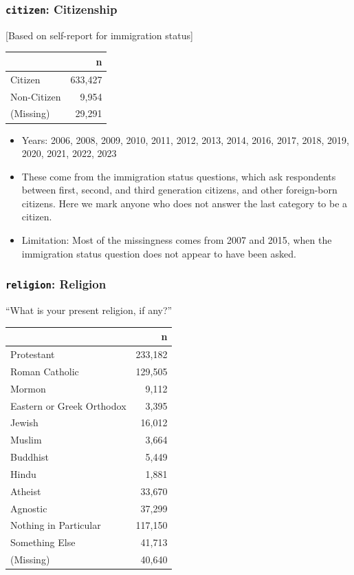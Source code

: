 \documentclass[10pt,article,oneside]{memoir}
\theoremstyle{definition}
\begin{document}
\subsubsection{\texorpdfstring{\texttt{citizen}:
Citizenship}{citizen: Citizenship}}\label{citizen-citizenship}

{[}Based on self-report for immigration status{]}

\begin{table}[H]
\centering
\begin{tabular}[t]{lr}
\toprule
 & n\\
\midrule
Citizen & 633,427\\
Non-Citizen & 9,954\\
(Missing) & 29,291\\
\bottomrule
\end{tabular}
\end{table}

\begin{itemize}
\tightlist
\item
  Years: 2006, 2008, 2009, 2010, 2011, 2012, 2013, 2014, 2016, 2017,
  2018, 2019, 2020, 2021, 2022, 2023
\item
  These come from the immigration status questions, which ask
  respondents between first, second, and third generation citizens, and
  other foreign-born citizens. Here we mark anyone who does not answer
  the last category to be a citizen.
\item
  Limitation: Most of the missingness comes from 2007 and 2015, when the
  immigration status question does not appear to have been asked.
\end{itemize}

\subsubsection{\texorpdfstring{\texttt{religion}:
Religion}{religion: Religion}}\label{religion-religion}

``What is your present religion, if any?''

\begin{table}[H]
\centering
\begin{tabular}[t]{lr}
\toprule
 & n\\
\midrule
Protestant & 233,182\\
Roman Catholic & 129,505\\
Mormon & 9,112\\
Eastern or Greek Orthodox & 3,395\\
Jewish & 16,012\\
Muslim & 3,664\\
Buddhist & 5,449\\
Hindu & 1,881\\
Atheist & 33,670\\
Agnostic & 37,299\\
Nothing in Particular & 117,150\\
Something Else & 41,713\\
(Missing) & 40,640\\
\bottomrule
\end{tabular}
\end{table}
\end{document}

